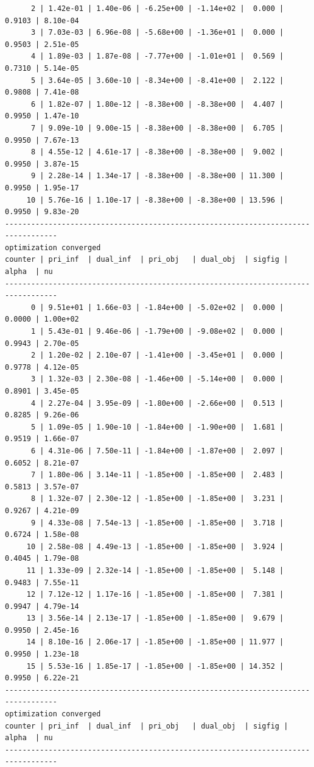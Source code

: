\documentclass[
]{book}
\begin{document}
\begin{verbatim}
      2 | 1.42e-01 | 1.40e-06 | -6.25e+00 | -1.14e+02 |  0.000 | 0.9103 | 8.10e-04
      3 | 7.03e-03 | 6.96e-08 | -5.68e+00 | -1.36e+01 |  0.000 | 0.9503 | 2.51e-05
      4 | 1.89e-03 | 1.87e-08 | -7.77e+00 | -1.01e+01 |  0.569 | 0.7310 | 5.14e-05
      5 | 3.64e-05 | 3.60e-10 | -8.34e+00 | -8.41e+00 |  2.122 | 0.9808 | 7.41e-08
      6 | 1.82e-07 | 1.80e-12 | -8.38e+00 | -8.38e+00 |  4.407 | 0.9950 | 1.47e-10
      7 | 9.09e-10 | 9.00e-15 | -8.38e+00 | -8.38e+00 |  6.705 | 0.9950 | 7.67e-13
      8 | 4.55e-12 | 4.61e-17 | -8.38e+00 | -8.38e+00 |  9.002 | 0.9950 | 3.87e-15
      9 | 2.28e-14 | 1.34e-17 | -8.38e+00 | -8.38e+00 | 11.300 | 0.9950 | 1.95e-17
     10 | 5.76e-16 | 1.10e-17 | -8.38e+00 | -8.38e+00 | 13.596 | 0.9950 | 9.83e-20
----------------------------------------------------------------------------------
optimization converged
counter | pri_inf  | dual_inf  | pri_obj   | dual_obj  | sigfig | alpha  | nu 
----------------------------------------------------------------------------------
      0 | 9.51e+01 | 1.66e-03 | -1.84e+00 | -5.02e+02 |  0.000 | 0.0000 | 1.00e+02
      1 | 5.43e-01 | 9.46e-06 | -1.79e+00 | -9.08e+02 |  0.000 | 0.9943 | 2.70e-05
      2 | 1.20e-02 | 2.10e-07 | -1.41e+00 | -3.45e+01 |  0.000 | 0.9778 | 4.12e-05
      3 | 1.32e-03 | 2.30e-08 | -1.46e+00 | -5.14e+00 |  0.000 | 0.8901 | 3.45e-05
      4 | 2.27e-04 | 3.95e-09 | -1.80e+00 | -2.66e+00 |  0.513 | 0.8285 | 9.26e-06
      5 | 1.09e-05 | 1.90e-10 | -1.84e+00 | -1.90e+00 |  1.681 | 0.9519 | 1.66e-07
      6 | 4.31e-06 | 7.50e-11 | -1.84e+00 | -1.87e+00 |  2.097 | 0.6052 | 8.21e-07
      7 | 1.80e-06 | 3.14e-11 | -1.85e+00 | -1.85e+00 |  2.483 | 0.5813 | 3.57e-07
      8 | 1.32e-07 | 2.30e-12 | -1.85e+00 | -1.85e+00 |  3.231 | 0.9267 | 4.21e-09
      9 | 4.33e-08 | 7.54e-13 | -1.85e+00 | -1.85e+00 |  3.718 | 0.6724 | 1.58e-08
     10 | 2.58e-08 | 4.49e-13 | -1.85e+00 | -1.85e+00 |  3.924 | 0.4045 | 1.79e-08
     11 | 1.33e-09 | 2.32e-14 | -1.85e+00 | -1.85e+00 |  5.148 | 0.9483 | 7.55e-11
     12 | 7.12e-12 | 1.17e-16 | -1.85e+00 | -1.85e+00 |  7.381 | 0.9947 | 4.79e-14
     13 | 3.56e-14 | 2.13e-17 | -1.85e+00 | -1.85e+00 |  9.679 | 0.9950 | 2.45e-16
     14 | 8.10e-16 | 2.06e-17 | -1.85e+00 | -1.85e+00 | 11.977 | 0.9950 | 1.23e-18
     15 | 5.53e-16 | 1.85e-17 | -1.85e+00 | -1.85e+00 | 14.352 | 0.9950 | 6.22e-21
----------------------------------------------------------------------------------
optimization converged
counter | pri_inf  | dual_inf  | pri_obj   | dual_obj  | sigfig | alpha  | nu 
----------------------------------------------------------------------------------

\end{verbatim}
\end{document}
